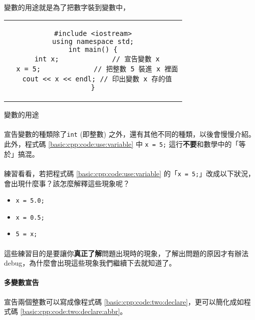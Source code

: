 \documentclass[12pt,a4paper,oneside]{report}
\begin{document}
\begin{CJK}{UTF8}{bkai}
\paragraph{}變數的用途就是為了把數字裝到變數中，
\begin{code}[h!]
\centering
\begin{tabular}{c}
\begin{lstlisting}
#include <iostream>
using namespace std;
int main() {
  int x;             // 宣告變數 x
  x = 5;             // 把整數 5 裝進 x 裡面
  cout << x << endl; // 印出變數 x 存的值
}
\end{lstlisting}
\end{tabular}
\caption{變數的用途}
\label{basic:cpp:code:use:variable}
\end{code}

\paragraph{}宣告變數的種類除了\lstinline!int! (即整數) 之外，還有其他不同的種類，以後會慢慢介紹。此外，程式碼 \ref{basic:cpp:code:use:variable} 中 \lstinline!x = 5;! 這行\textbf{不要}和數學中的「等於」搞混。
  
\paragraph{}練習看看，若把程式碼 \ref{basic:cpp:code:use:variable} 的「\lstinline!x = 5;!」改成以下狀況，會出現什麼事？該怎麼解釋這些現象呢？
\begin{itemize}
\item \lstinline!x = 5.0;!
\item \lstinline!x = 0.5;!
\item \lstinline!5 = x;!
\end{itemize}

\paragraph{}這些練習目的是要讓你\textbf{真正了解}問題出現時的現象，了解出問題的原因才有辦法 debug，為什麼會出現這些現象我們繼續下去就知道了。

\paragraph{多變數宣告}宣告兩個整數可以寫成像程式碼 \ref{basic:cpp:code:two:declare}，更可以簡化成如程式碼 \ref{basic:cpp:code:two:declare:abbr}。


\end{CJK}
\end{document}
